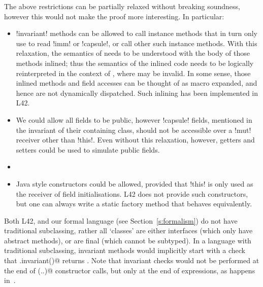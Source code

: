 The above restrictions can be partially relaxed without breaking soundness, however this would not make the proof more interesting. In particular:
\begin{itemize}
	\item \Q!invariant! methods can be allowed to call instance methods that in turn only use \Q@this@ to read \Q!imm! or \Q!capsule!, or call other such instance methods. With this relaxation, the semantics of \Q@invariant@ needs to be understood with the body of those methods inlined; thus the semantics of the inlined code needs to be logically reinterpreted in the context of \Q@invariant@, where \Q@this@ may be invalid. In some sense, those inlined methods and field accesses can be thought of as macro expanded, and hence are not dynamically dispatched. Such inlining has been implemented in L42.
	\item We could allow all fields to be public, however \Q!capsule! fields, mentioned in the invariant of their containing class, should not be accessible over a \Q!mut! receiver other than \Q!this!. Even without this relaxation, however, getters and setters could be used to simulate public fields.
	\item {}
	
	\item Java style constructors could be allowed, provided that \Q!this! is only used as the receiver of field initialisations. L42 does not provide such constructors, but one can always write a static factory method that behaves equivalently.
\end{itemize}
Both L42, and our formal language (see Section~\ref{s:formalism}) do not have traditional subclassing, rather all `classes' are either interfaces (which only have abstract methods), or are final (which cannot be subtyped). In a language with traditional subclassing, invariant methods would implicitly start with a check that \Q@super.invariant()@ returns \Q@true@. Note that invariant checks would not be performed at the end of \Q@super(..)@ constructor calls, but only at the end of \Q@new@ expressions, as happens in~\cite{feldman2006jose}.

